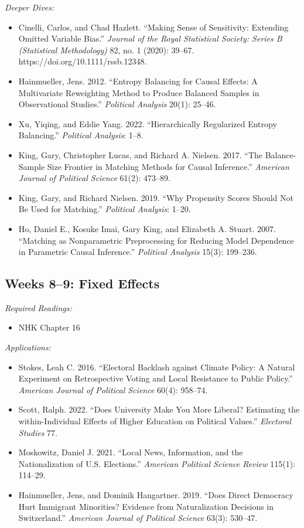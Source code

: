 \documentclass[11pt, letterpaper]{article}
\begin{document}
\noindent \textit{Deeper Dives:}

\begin{itemize}
	\item Cinelli, Carlos, and Chad Hazlett. ``Making Sense of Sensitivity: Extending Omitted Variable Bias.'' \textit{Journal of the Royal Statistical Society: Series B (Statistical Methodology)} 82, no. 1 (2020): 39–67. https://doi.org/10.1111/rssb.12348.
	\item Hainmueller, Jens. 2012. ``Entropy Balancing for Causal Effects: A Multivariate Reweighting Method to Produce Balanced Samples in Observational Studies.'' \textit{Political Analysis} 20(1): 25–46.
	\item Xu, Yiqing, and Eddie Yang. 2022. ``Hierarchically Regularized Entropy Balancing.'' \textit{Political Analysis}: 1–8.
	\item King, Gary, Christopher Lucas, and Richard A. Nielsen. 2017. ``The Balance-Sample Size Frontier in Matching Methods for Causal Inference.'' \textit{American Journal of Political Science} 61(2): 473–89.
	\item King, Gary, and Richard Nielsen. 2019. ``Why Propensity Scores Should Not Be Used for Matching.'' \textit{Political Analysis}: 1–20.
	\item Ho, Daniel E., Kosuke Imai, Gary King, and Elizabeth A. Stuart. 2007. “Matching as Nonparametric Preprocessing for Reducing Model Dependence in Parametric Causal Inference.” \textit{Political Analysis} 15(3): 199–236.
\end{itemize}

\subsection*{Weeks 8--9: Fixed Effects}

\textit{Required Readings:}

\begin{itemize}
	\item NHK Chapter 16
\end{itemize}

\noindent \textit{Applications:}

\begin{itemize}
	\item Stokes, Leah C. 2016. ``Electoral Backlash against Climate Policy: A Natural Experiment on Retrospective Voting and Local Resistance to Public Policy.'' \textit{American Journal of Political Science} 60(4): 958–74.
	\item Scott, Ralph. 2022. “Does University Make You More Liberal? Estimating the within-Individual Effects of Higher Education on Political Values.” \textit{Electoral Studies} 77.
	\item Moskowitz, Daniel J. 2021. “Local News, Information, and the Nationalization of U.S. Elections.” \textit{American Political Science Review} 115(1): 114–29.
	\item Hainmueller, Jens, and Dominik Hangartner. 2019. “Does Direct Democracy Hurt Immigrant Minorities? Evidence from Naturalization Decisions in Switzerland.” \textit{American Journal of Political Science} 63(3): 530–47.
\end{itemize}
\end{document}
